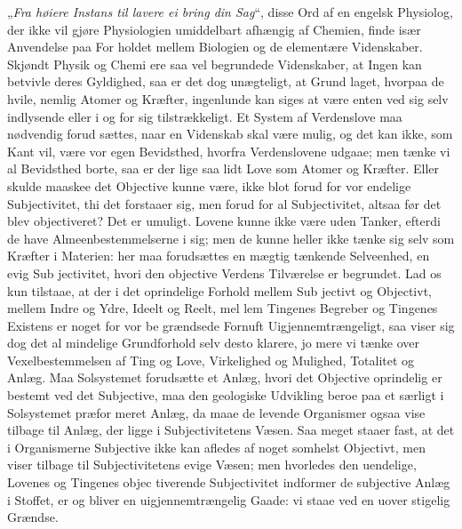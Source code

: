 \documentclass[12pt,a4paper]{article}
\newcommand{\opage}[1]{\marginnote{\footnotesize\textit{[#1]}}}
\begin{document}
\opage{41}„\emph{Fra høiere Instans til lavere ei bring din Sag}“,
disse Ord af en engelsk Physiolog, der ikke vil gjøre Physiologien
umiddelbart afhængig af Chemien, finde især Anvendelse paa For\-%
holdet mellem Biologien og de elementære Videnskaber. Skjøndt
Physik og Chemi ere saa vel begrundede Videnskaber, at Ingen
kan betvivle deres Gyldighed, saa er det dog unægteligt, at Grund\-%
laget, hvorpaa de hvile, nemlig Atomer og Kræfter, ingenlunde
kan siges at være enten ved sig selv indlysende eller i og for sig
tilstrækkeligt. Et System af Verdenslove maa nødvendig forud\-%
sættes, naar en Videnskab skal være mulig, og det kan ikke, som
Kant vil, være vor egen Bevidsthed, hvorfra Verdenslovene udgaae;
men tænke vi al Bevidsthed borte, saa er der lige saa lidt Love
som Atomer og Kræfter. Eller skulde maaskee det Objective
kunne være, ikke blot forud for vor endelige Subjectivitet, thi det
forstaaer sig, men forud for al Subjectivitet, altsaa før det blev
objectiveret? Det er umuligt. Lovene kunne ikke være uden
Tanker, efterdi de have Almeenbestemmelserne i sig; men de
kunne heller ikke tænke sig selv som Kræfter i Materien: her
maa forudsættes en mægtig tænkende Selveenhed, en evig Sub\-%
jectivitet, hvori den objective Verdens Tilværelse er begrundet.
Lad os kun tilstaae, at der i det oprindelige Forhold mellem Sub\-%
jectivt og Objectivt, mellem Indre og Ydre, Ideelt og Reelt, mel\-%
lem Tingenes Begreber og Tingenes Existens er noget for vor be\-%
grændsede Fornuft Uigjennemtrængeligt, saa viser sig dog det al\-%
mindelige Grundforhold selv desto klarere, jo mere vi tænke over
Vexelbestemmelsen af Ting og Love, Virkelighed og Mulighed,
Totalitet og Anlæg. Maa Solsystemet forudsætte et Anlæg, hvori
det Objective oprindelig er bestemt ved det Subjective, maa den
geologiske Udvikling beroe paa et særligt i Solsystemet præfor\-%
meret Anlæg, da maae de levende Organismer ogsaa vise tilbage
til Anlæg, der ligge i Subjectivitetens Væsen. Saa meget staaer
fast, at det i Organismerne Subjective ikke kan afledes af noget\-%
somhelst Objectivt, men viser tilbage til Subjectivitetens evige
Væsen; men hvorledes den uendelige, Lovenes og Tingenes objec\-%
tiverende Subjectivitet indformer de subjective Anlæg i Stoffet, er
\opage{42}og bliver en uigjennemtrængelig Gaade: vi staae ved en uover\-%
stigelig Grændse.
\end{document}
